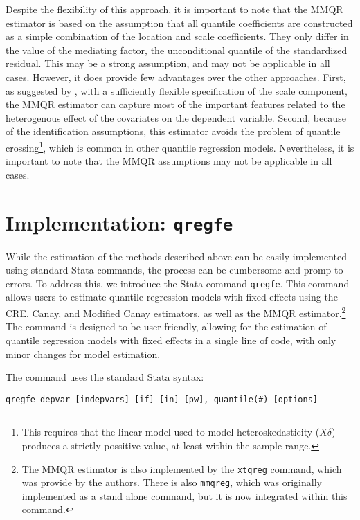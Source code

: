 \documentclass[bib]{statapress}
\begin{document}
Despite the flexibility of this approach, it is important to note that
the MMQR estimator is based on the assumption that all quantile
coefficients are constructed as a simple combination of the location and
scale coefficients. They only differ in the value of the mediating
factor, the unconditional quantile of the standardized residual. This
may be a strong assumption, and may not be applicable in all cases.
However, it does provide few advantages over the other approaches.
First, as suggested by \citet{mss2019}, with a sufficiently flexible
specification of the scale component, the MMQR estimator can capture
most of the important features related to the heterogenous effect of the
covariates on the dependent variable. Second, because of the
identification assumptions, this estimator avoids the problem of
quantile crossing\footnote{This requires that the linear model used to
  model heteroskedasticity (\(X\delta\)) produces a strictly possitive
  value, at least within the sample range.}, which is common in other
quantile regression models. Nevertheless, it is important to note that
the MMQR assumptions may not be applicable in all cases.

\section{\texorpdfstring{Implementation:
\texttt{qregfe}}{Implementation: qregfe}}\label{sec-implementation}

While the estimation of the methods described above can be easily
implemented using standard Stata commands, the process can be cumbersome
and promp to errors. To address this, we introduce the Stata command
\texttt{qregfe}. This command allows users to estimate quantile
regression models with fixed effects using the CRE, Canay, and Modified
Canay estimators, as well as the MMQR estimator.\footnote{The MMQR
  estimator is also implemented by the \texttt{xtqreg} command, which
  was provide by the authors. There is also \texttt{mmqreg}, which was
  originally implemented as a stand alone command, but it is now
  integrated within this command.} The command is designed to be
user-friendly, allowing for the estimation of quantile regression models
with fixed effects in a single line of code, with only minor changes for
model estimation.

The command uses the standard Stata syntax:

\begin{verbatim}
qregfe depvar [indepvars] [if] [in] [pw], quantile(#) [options]
\end{verbatim}
\end{document}
